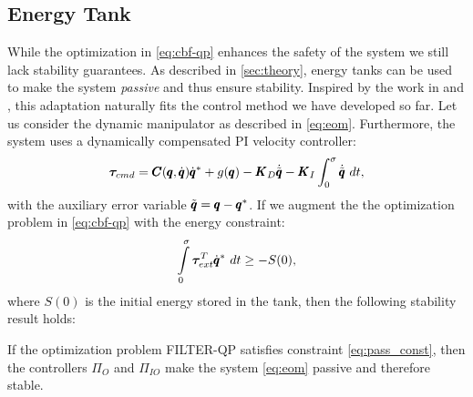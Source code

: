 \subsection{Energy Tank}
While the optimization in \eqref{eq:cbf-qp} enhances the safety of the system we still lack stability guarantees. As described in \sect \ref{sec:theory}, energy tanks can be used to make the system \emph{passive} and thus ensure stability. Inspired by the work in \cite{benzi2021optimization} and \cite{shahriari2018valve}, this adaptation naturally fits the control method we have developed so far. Let us consider the dynamic manipulator as described in \eqref{eq:eom}. Furthermore, the system uses a dynamically compensated PI velocity controller: 
\begin{equation} \label{eq:low-level-control}
\boldsymbol{\tau}_{cmd} = \pmb{C}(\pmb{q}, \dot{\pmb{q}}) \dot{\pmb{q}}^* + g(\pmb{q}) - \pmb{K}_D \dot{\tilde{\pmb{q}}} - \pmb{K}_I \int_{0}^{\sigma} \dot{\tilde{\pmb{q}}}\ dt,
\end{equation}
with the auxiliary error variable $\tilde{\pmb{q}} =  \pmb{q} - \pmb{q}^*$. If we augment the the optimization problem in \eqref{eq:cbf-qp} with the energy constraint:
\begin{equation}\label{eq:pass_const}
    \int\limits_{0}^{\sigma} \boldsymbol{\tau}_{ext}^T \dot{\pmb{q}}^* \ dt \geq -S(0),
\end{equation}
where $S(0)$ is the initial energy stored in the tank, then the following stability result holds:

\begin{theorem}
If the optimization problem FILTER-QP satisfies constraint \eqref{eq:pass_const}, then the controllers $\Pi_O$ and $\Pi_{IO}$ make the system \eqref{eq:eom} passive and therefore stable. 
\end{theorem}



